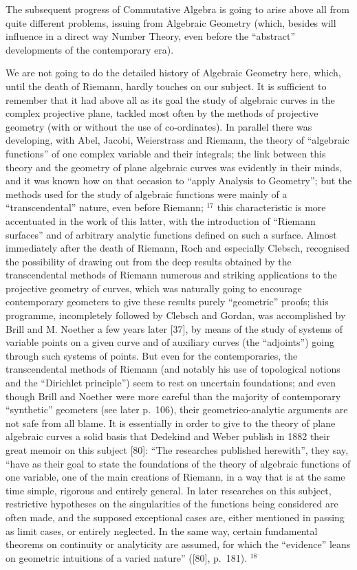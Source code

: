 The subsequent progress of Commutative Algebra is going to arise above all from quite different problems, issuing from Algebraic Geometry (which, besides will influence in a direct way Number Theory, even before the ``abstract'' developments of the contemporary era).

We are not going to do the detailed history of Algebraic Geometry here, which, until the death of Riemann, hardly touches on our subject. It is sufficient to remember that it had above all as its goal the study of algebraic curves in the complex projective plane, tackled most often by the methods of projective geometry (with or without the use of co-ordinates). In parallel there was developing, with Abel, Jacobi, Weierstrass and Riemann, the theory of ``algebraic functions'' of one complex variable and their integrals; the link between this theory and the geometry of plane algebraic curves was evidently in their minds, and it was known how on that occasion to ``apply Analysis to Geometry''; but the methods used for the study of algebraic functions were mainly of a ``transcendental'' nature, even before Riemann; \(^{17}\) this characteristic is more accentuated in the work of this latter, with the introduction of ``Riemann surfaces'' and of arbitrary analytic functions defined on such a surface. Almost immediately after the death of Riemann, Roch and especially Clebsch, recognised the possibility of drawing out from the deep results obtained by the transcendental methods of Riemann numerous and striking applications to the projective geometry of curves, which was naturally going to encourage contemporary geometers to give these results purely ``geometric'' proofs; this programme, incompletely followed by Clebsch and Gordan, was accomplished by Brill and M. Noether a few years later {[}37{]}, by means of the study of systems of variable points on a given curve and of auxiliary curves (the ``adjoints'') going through such systems of points. But even for the contemporaries, the transcendental methods of Riemann (and notably his use of topological notions and the ``Dirichlet principle'') seem to rest on uncertain foundations; and even though Brill and Noether were more careful than the majority of contemporary ``synthetic'' geometers (see later p.~106), their geometrico-analytic arguments are not safe from all blame. It is essentially in order to give to the theory of plane algebraic curves a solid basis that Dedekind and Weber publish in 1882 their great memoir on this subject {[}80{]}: ``The researches published herewith'', they say, ``have as their goal to state the foundations of the theory of algebraic functions of one variable, one of the main creations of Riemann, in a way that is at the same time simple, rigorous and entirely general. In later researches on this subject, restrictive hypotheses on the singularities of the functions being considered are often made, and the supposed exceptional cases are, either mentioned in passing as limit cases, or entirely neglected. In the same way, certain fundamental theorems on continuity or analyticity are assumed, for which the ``evidence'' leans on geometric intuitions of a varied nature'' ({[}80{]}, p.~181). \(^{18}\)

